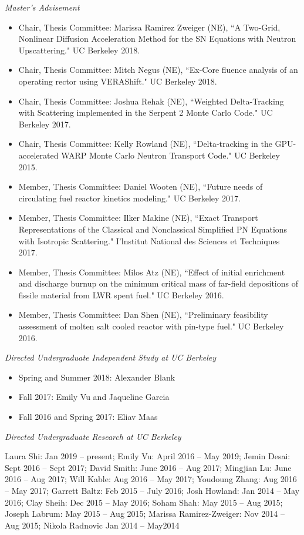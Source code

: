 \textit{Master's Advisement}
\begin{itemize}
\item Chair, Thesis Committee: Marissa Ramirez Zweiger (NE), ``A Two-Grid, Nonlinear Diffusion Acceleration Method for the SN Equations with Neutron Upscattering." UC Berkeley 2018.
%
\item Chair, Thesis Committee: Mitch Negus (NE), ``Ex-Core fluence analysis of an operating rector using VERAShift." UC Berkeley 2018.
%
\item Chair, Thesis Committee: Joshua Rehak (NE), ``Weighted Delta-Tracking with Scattering implemented in the Serpent 2 Monte Carlo Code." UC Berkeley 2017.
%
\item Chair, Thesis Committee: Kelly Rowland (NE), ``Delta-tracking in the GPU-accelerated WARP Monte Carlo Neutron Transport Code." UC Berkeley 2015.
%
\item Member, Thesis Committee: Daniel Wooten (NE), ``Future needs of circulating fuel reactor kinetics modeling." UC Berkeley 2017.
\item Member, Thesis Committee: Ilker Makine (NE), ``Exact Transport Representations of the Classical and Nonclassical Simplified PN Equations with Isotropic Scattering." I'lnstitut National des Sciences et Techniques 2017.
%
\item Member, Thesis Committee: Milos Atz (NE), ``Effect of initial enrichment and discharge burnup on the minimum critical mass of far-field depositions of fissile material from LWR spent fuel." UC Berkeley 2016.
%
\item Member, Thesis Committee: Dan Shen (NE), ``Preliminary feasibility assessment of molten salt cooled reactor with pin-type fuel." UC Berkeley 2016.
\end{itemize}

\textit{Directed Undergraduate Independent Study at UC Berkeley}
\begin{itemize}
\item Spring and Summer 2018: Alexander Blank
\item Fall 2017: Emily Vu and Jaqueline Garcia
\item Fall 2016 and Spring 2017: Eliav Maas
\end{itemize}
\textit{Directed Undergraduate Research at UC Berkeley}
\vspace*{-.6 em}
\begin{addmargin}[1em]{0 em}
Laura Shi: Jan 2019 -- present;
Emily Vu: April 2016 -- May 2019; 
Jemin Desai: Sept 2016 -- Sept 2017; 
David Smith: June 2016 -- Aug 2017; 
Mingjian Lu: June 2016 -- Aug 2017; 
Will Kable: Aug 2016 -- May 2017; 
Youdoung Zhang: Aug 2016 -- May 2017; 
Garrett Baltz: Feb 2015 -- July 2016; 
Josh Howland: Jan 2014 -- May 2016; 
Clay Sheih: Dec 2015 -- May 2016;
Soham Shah: May 2015 -- Aug 2015; 
Joseph Labrum: May 2015 -- Aug 2015; 
Marissa Ramirez-Zweiger: Nov 2014 -- Aug 2015; 
Nikola Radnovic Jan 2014 -- May2014 

\end{addmargin}

